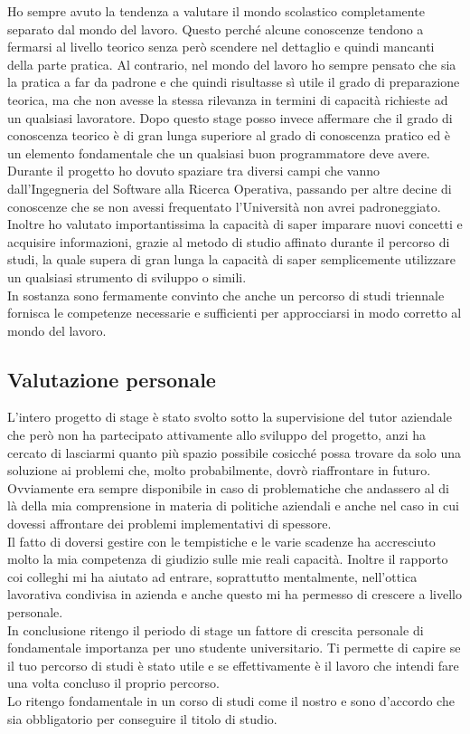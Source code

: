 Ho sempre avuto la tendenza a valutare il mondo scolastico completamente separato dal mondo del lavoro. Questo perché alcune conoscenze tendono a fermarsi al livello teorico
senza però scendere nel dettaglio e quindi mancanti della parte pratica. Al contrario, nel mondo del lavoro ho sempre pensato che sia la pratica a far da padrone e che quindi
risultasse sì utile il grado di preparazione teorica, ma che non avesse la stessa rilevanza in termini di capacità richieste ad un qualsiasi lavoratore. Dopo questo stage posso
invece affermare che il grado di conoscenza teorico è di gran lunga superiore al grado di conoscenza pratico ed è un elemento fondamentale che un qualsiasi buon programmatore 
deve avere.\\ Durante il progetto ho dovuto spaziare tra diversi campi che vanno dall'Ingegneria del Software alla Ricerca Operativa, passando per altre decine di conoscenze
che se non avessi frequentato l'Università non avrei padroneggiato. Inoltre ho valutato importantissima la capacità di saper imparare nuovi concetti e acquisire informazioni,
grazie al metodo di studio affinato durante il percorso di studi, la quale supera di gran lunga la capacità di saper semplicemente utilizzare un qualsiasi strumento
di sviluppo o simili.\\ In sostanza sono fermamente convinto che anche un percorso di studi triennale fornisca le competenze necessarie e sufficienti per approcciarsi in modo
corretto al mondo del lavoro.

\subsection{Valutazione personale}

L'intero progetto di stage è stato svolto sotto la supervisione del tutor aziendale che però non ha partecipato attivamente allo sviluppo del progetto, anzi ha cercato di 
lasciarmi quanto più spazio possibile cosicché possa trovare da solo una soluzione ai problemi che, molto probabilmente, dovrò riaffrontare in futuro. Ovviamente era sempre
disponibile in caso di problematiche che andassero al di là della mia comprensione in materia di politiche aziendali e anche nel caso in cui dovessi affrontare dei problemi
implementativi di spessore.\\ Il fatto di doversi gestire con le tempistiche e le varie scadenze ha accresciuto molto la mia competenza di giudizio sulle mie reali capacità.
Inoltre il rapporto coi colleghi mi ha aiutato ad entrare, soprattutto mentalmente, nell'ottica lavorativa condivisa in azienda e anche questo mi ha permesso di crescere
a livello personale.\\ In conclusione ritengo il periodo di stage un fattore di crescita personale di fondamentale importanza per uno studente universitario. Ti permette di capire
se il tuo percorso di studi è stato utile e se effettivamente è il lavoro che intendi fare una volta concluso il proprio percorso.\\ Lo ritengo fondamentale in un corso di studi
come il nostro e sono d'accordo che sia obbligatorio per conseguire il titolo di studio.